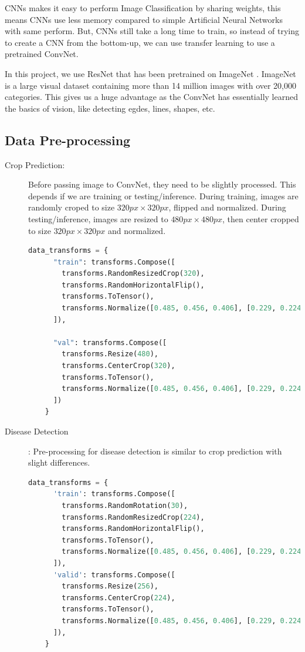 \documentclass[../Report.tex]{subfiles}
\begin{document}
CNNs makes it easy to perform Image Classification by sharing weights, this means CNNs use less memory compared to simple Artificial Neural 
Networks with same perform. But, CNNs still take a long time to train, so instead of trying to create a CNN from the bottom-up, we can use 
transfer learning to use a pretrained ConvNet.\par

In this project, we use ResNet that has been pretrained on ImageNet \cite{imagenet}. ImageNet is a large visual dataset containing more than 
14 million images with over 20,000 categories. This gives us a huge advantage as the ConvNet has essentially learned the basics of vision, 
like detecting egdes, lines, shapes, etc.\par

\subsection{Data Pre-processing}
\begin{description}
  \item[Crop Prediction:] Before passing image to ConvNet, they need to be slightly processed. This depends if we are training or 
  testing/inference. During training, images are randomly croped to size $320px \times 320px$, flipped and normalized. 
  During testing/inference, images are resized to $480px \times 480px$, then center cropped to size $320px \times 320px$ and normalized.

  \begin{lstlisting}[language=python,caption={Crop Prediction Image Pre-processing},captionpos=b]
    data_transforms = {
      "train": transforms.Compose([
        transforms.RandomResizedCrop(320),
        transforms.RandomHorizontalFlip(),
        transforms.ToTensor(),
        transforms.Normalize([0.485, 0.456, 0.406], [0.229, 0.224, 0.225])
      ]),
      
      "val": transforms.Compose([
        transforms.Resize(480),
        transforms.CenterCrop(320),
        transforms.ToTensor(),
        transforms.Normalize([0.485, 0.456, 0.406], [0.229, 0.224, 0.225])
      ])
    }
  \end{lstlisting}

  \item[Disease Detection]: Pre-processing for disease detection is similar to crop prediction with slight differences.
  
  \begin{lstlisting}[language=python,caption={Disease Detection Image Pre-processing},captionpos=b]
    data_transforms = {
      'train': transforms.Compose([
        transforms.RandomRotation(30),
        transforms.RandomResizedCrop(224),
        transforms.RandomHorizontalFlip(),
        transforms.ToTensor(),
        transforms.Normalize([0.485, 0.456, 0.406], [0.229, 0.224, 0.225])
      ]),
      'valid': transforms.Compose([
        transforms.Resize(256),
        transforms.CenterCrop(224),
        transforms.ToTensor(),
        transforms.Normalize([0.485, 0.456, 0.406], [0.229, 0.224, 0.225])
      ]),
    }
  \end{lstlisting}

\end{description}
\end{document}
